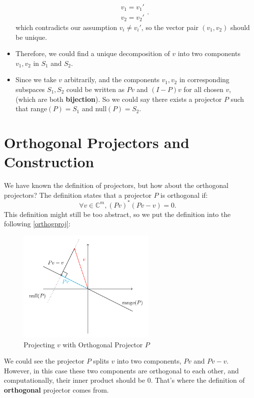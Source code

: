 \begin{itemize}
\[      \begin{array}{l}
      v_1 = v_1' \\
      v_2 = v_2'
      \end{array}
    .\]
    which contradicts our assumption $v_i \neq v_i'$, so the vector pair $(v_1, v_2)$ should be unique.
    \item Therefore, we could find a unique decomposition of $v$ into two components $v_1, v_2$ in  $S_1$ and $S_2$. 
    \item Since we take $v$ arbitrarily, and the components  $v_1, v_2$ in corresponding subspaces $S_1, S_2$ could be written as $Pv$ and  $(I - P)v$ for all chosen $v$, (which are both \textbf{bijection}). So we could say there exists a projector  $P$ such that range$(P) = S_1$ and null$(P) = S_2$.
\end{itemize}


\section{Orthogonal Projectors and Construction}%
We have known the definition of projectors, but how about the orthogonal projectors? The definition states that a projector $P$ is orthogonal if:
\[
\forall v \in \mathbb{C}^{m}, (Pv)^{*}(Pv - v) = 0
.\] 
This definition might still be too abstract, so we put the definition into the following \autoref{orthogproj}:
  \begin{figure}[H]
    \centering
    \includegraphics[width=0.6\textwidth]{imgs/orthogonal_proj.png}
    \caption{Projecting $v$ with Orthogonal Projector $P$}
    \label{orthogproj}
  \end{figure}

\noindent We could see the projector $P$ splits $v$ into two components,  $Pv$ and  $Pv - v$. However, in this case these two components are orthogonal to each other, and computationally, their inner product should be 0. That's where the definition of  \textbf{orthogonal} projector comes from. 

